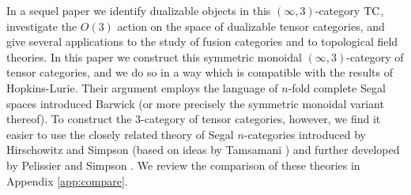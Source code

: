 \documentclass{amsart}
\begin{document}
In a sequel paper \cite{DSPS} we identify dualizable objects in this $(\infty, 3)$-category $\mathrm{TC}$, investigate the $O(3)$ action on the space of dualizable tensor categories, and give several applications to the study of fusion categories and to topological field theories.  In this paper we construct this symmetric monoidal $(\infty,3)$-category of tensor categories, and we do so in a way which is compatible with the results of Hopkins-Lurie.  Their argument employs the language of $n$-fold complete Segal spaces introduced Barwick \cite{Barwick:thesis} (or more precisely the symmetric monoidal variant thereof). To construct the 3-category of tensor categories, however, we find it easier to use the closely related theory of Segal $n$-categories introduced by Hirschowitz and Simpson \cite{9807049} (based on ideas by Tamsamani \cite{Tamsamani:thesis}) and further developed by Pelissier \cite{Pelissier:thesis} and Simpson \cite{1001.4071}. We review the comparison of these theories in Appendix \ref{app:compare}. %


\end{document}
